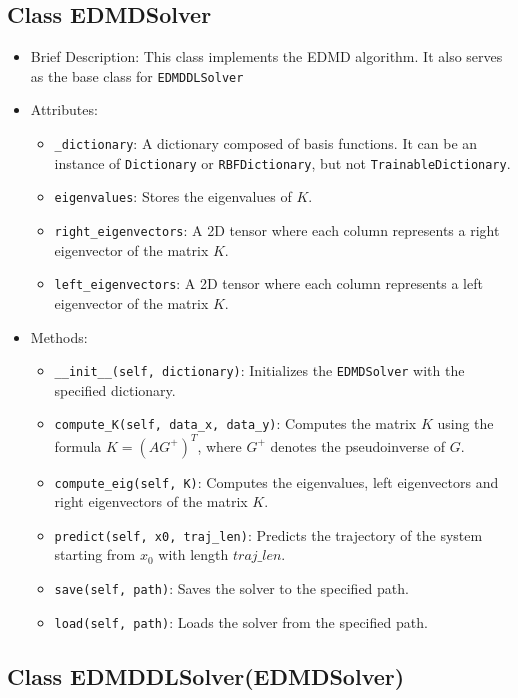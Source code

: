 \subsection{Class EDMDSolver}

\begin{itemize}
\item Brief Description: This class implements the EDMD algorithm.
  It also serves as the base class for \lstinline|EDMDDLSolver|
\item Attributes:
  \begin{itemize}
  \item \lstinline|_dictionary|:
    A dictionary composed of basis functions.
    It can be an instance of \lstinline|Dictionary|
    or \lstinline|RBFDictionary|,
    but not \lstinline|TrainableDictionary|.
  \item \lstinline|eigenvalues|: Stores the eigenvalues of $K$.
  \item \lstinline|right_eigenvectors|: A 2D tensor where each column represents a right eigenvector of the matrix $K$.
  \item \lstinline|left_eigenvectors|: A 2D tensor where each column represents a left eigenvector of the matrix $K$.
  \end{itemize}
\item Methods:
  \begin{itemize}
  \item \lstinline|__init__(self, dictionary)|:
    Initializes the \lstinline|EDMDSolver| with the specified dictionary.
  \item \lstinline|compute_K(self, data_x, data_y)|:
    Computes the matrix $K$ using the formula $K = (AG^+)^T$,
    where $G^+$ denotes the pseudoinverse of $G$.
  \item \lstinline|compute_eig(self, K)|: Computes the eigenvalues,
    left eigenvectors and right eigenvectors of the matrix $K$.
  \item \lstinline|predict(self, x0, traj_len)|: 
    Predicts the trajectory of the system starting from $x_0$
    with length $traj\_len$.
  \item \lstinline|save(self, path)|: Saves the solver to the specified path.
  \item \lstinline|load(self, path)|: Loads the solver from the specified path.
  \end{itemize}
\end{itemize}

\subsection{Class EDMDDLSolver(EDMDSolver)}

